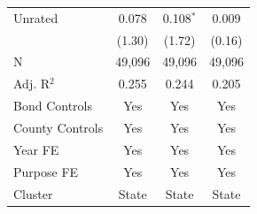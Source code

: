 \begin{tabular*}{\textwidth}{@{\extracolsep{\fill}}lccc}
   Unrated               & 0.078          & 0.108$^{*}$    & 0.009\\   
                         & (1.30)        & (1.72)        & (0.16)\\   
   \hline
   N          & 49,096         & 49,096         & 49,096\\  
   Adj. R$^2$        & 0.255          & 0.244          & 0.205\\  
   Bond Controls         & Yes            & Yes            & Yes\\  
   County Controls       & Yes            & Yes            & Yes\\  
   Year FE               & Yes            & Yes            & Yes\\  
   Purpose FE            & Yes            & Yes            & Yes\\  
   Cluster              & State & State & State\\  
   \bottomrule
\end{tabular*}
\par\endgroup
